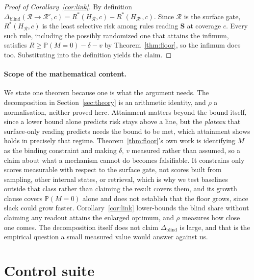 \documentclass{article}
\newcommand{\gate}{\mathbf{S}}
\begin{document}
\begin{proof}[Proof of Corollary~\ref{cor:link}]
By definition $\Delta_{\mathrm{blind}}(\mathcal{R}\to\mathcal{R}',c)=R^\ast(H_{\mathcal{R}},c)-R^\ast(H_{\mathcal{R}'},c)$.
Since $\mathcal{R}$ is the surface gate, $R^\ast(H_{\mathcal{R}},c)$ is the least selective risk among
rules reading $\gate$ at coverage $c$. Every such rule, including the possibly randomized one that
attains the infimum, satisfies $R\ge\mathbb{P}(M=0)-\delta-v$ by Theorem~\ref{thm:floor}, so the
infimum does too. Substituting into the definition yields the claim.
\end{proof}

\paragraph{Scope of the mathematical content.} We state one theorem because one is what the argument
needs. The decomposition in Section~\ref{sec:theory} is an arithmetic identity, and $\rho$ a
normalisation, neither proved here. Attainment matters beyond the bound itself, since a lower bound
alone predicts risk stays above a line, but the \emph{plateau} that surface-only reading predicts
needs the bound to be met, which attainment shows holds in precisely that regime. Theorem~\ref{thm:floor}'s own work is identifying $M$ as the
binding constraint and making $\delta$, $v$ measured rather than assumed, so a claim about what a
mechanism cannot do becomes falsifiable. It constrains only scores measurable with respect to the
surface gate, not scores built from sampling, other internal states, or retrieval, which is why we
test baselines outside that class rather than claiming the result covers them, and its growth clause
covers $\mathbb{P}(M=0)$ alone and does not establish that the floor grows, since slack could grow
faster. Corollary~\ref{cor:link} lower-bounds the blind share without claiming any readout attains the
enlarged optimum, and $\rho$ measures how close one comes. The decomposition itself does not claim
$\Delta_{\mathrm{blind}}$ is large, and that is the empirical question a small measured value would
answer against us.


\section{Control suite}
\label{app:controls}
\end{document}
